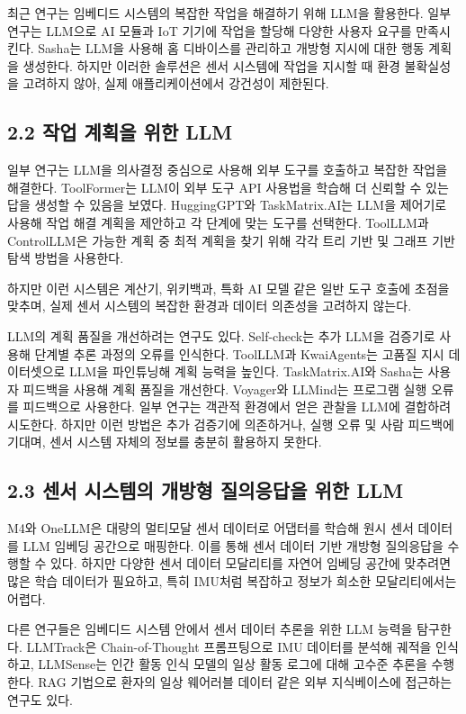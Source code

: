 \documentclass[sigconf,nonacm]{acmart}
\begin{document}
최근 연구는 임베디드 시스템의 복잡한 작업을 해결하기 위해 LLM을 활용한다. 일부 연구는 LLM으로 AI 모듈과 IoT 기기에 작업을 할당해 다양한 사용자 요구를 만족시킨다. Sasha는 LLM을 사용해 홈 디바이스를 관리하고 개방형 지시에 대한 행동 계획을 생성한다. 하지만 이러한 솔루션은 센서 시스템에 작업을 지시할 때 환경 불확실성을 고려하지 않아, 실제 애플리케이션에서 강건성이 제한된다.

\subsection{2.2 작업 계획을 위한 LLM}

일부 연구는 LLM을 의사결정 중심으로 사용해 외부 도구를 호출하고 복잡한 작업을 해결한다. ToolFormer는 LLM이 외부 도구 API 사용법을 학습해 더 신뢰할 수 있는 답을 생성할 수 있음을 보였다. HuggingGPT와 TaskMatrix.AI는 LLM을 제어기로 사용해 작업 해결 계획을 제안하고 각 단계에 맞는 도구를 선택한다. ToolLLM과 ControlLLM은 가능한 계획 중 최적 계획을 찾기 위해 각각 트리 기반 및 그래프 기반 탐색 방법을 사용한다.

하지만 이런 시스템은 계산기, 위키백과, 특화 AI 모델 같은 일반 도구 호출에 초점을 맞추며, 실제 센서 시스템의 복잡한 환경과 데이터 의존성을 고려하지 않는다.

LLM의 계획 품질을 개선하려는 연구도 있다. Self-check는 추가 LLM을 검증기로 사용해 단계별 추론 과정의 오류를 인식한다. ToolLLM과 KwaiAgents는 고품질 지시 데이터셋으로 LLM을 파인튜닝해 계획 능력을 높인다. TaskMatrix.AI와 Sasha는 사용자 피드백을 사용해 계획 품질을 개선한다. Voyager와 LLMind는 프로그램 실행 오류를 피드백으로 사용한다. 일부 연구는 객관적 환경에서 얻은 관찰을 LLM에 결합하려 시도한다. 하지만 이런 방법은 추가 검증기에 의존하거나, 실행 오류 및 사람 피드백에 기대며, 센서 시스템 자체의 정보를 충분히 활용하지 못한다.

\subsection{2.3 센서 시스템의 개방형 질의응답을 위한 LLM}

M4와 OneLLM은 대량의 멀티모달 센서 데이터로 어댑터를 학습해 원시 센서 데이터를 LLM 임베딩 공간으로 매핑한다. 이를 통해 센서 데이터 기반 개방형 질의응답을 수행할 수 있다. 하지만 다양한 센서 데이터 모달리티를 자연어 임베딩 공간에 맞추려면 많은 학습 데이터가 필요하고, 특히 IMU처럼 복잡하고 정보가 희소한 모달리티에서는 어렵다.

다른 연구들은 임베디드 시스템 안에서 센서 데이터 추론을 위한 LLM 능력을 탐구한다. LLMTrack은 Chain-of-Thought 프롬프팅으로 IMU 데이터를 분석해 궤적을 인식하고, LLMSense는 인간 활동 인식 모델의 일상 활동 로그에 대해 고수준 추론을 수행한다. RAG 기법으로 환자의 일상 웨어러블 데이터 같은 외부 지식베이스에 접근하는 연구도 있다.
\end{document}
